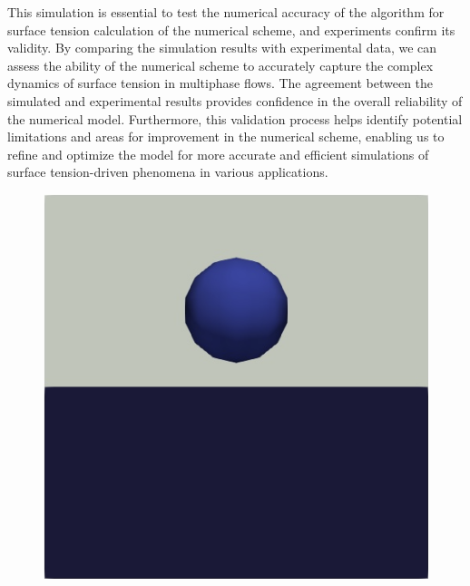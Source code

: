 This simulation is essential to test the numerical accuracy of the algorithm for surface tension calculation of the numerical scheme, and experiments confirm its validity. By comparing the simulation results with experimental data, we can assess the ability of the numerical scheme to accurately capture the complex dynamics of surface tension in multiphase flows. The agreement between the simulated and experimental results provides confidence in the overall reliability of the numerical model. Furthermore, this validation process helps identify potential limitations and areas for improvement in the numerical scheme, enabling us to refine and optimize the model for more accurate and efficient simulations of surface tension-driven phenomena in various applications.
\begin{figure}[H]
    \centering
    \begin{minipage}{.4\textwidth}
        \centering
        \includegraphics[width=\linewidth]{GWU_Thesis_Sarmakeeva/Images/chap4/water_sphere/sphere_in_water0.png}
    \end{minipage}%
    \hspace{0.05\textwidth}
    \begin{minipage}{.4\textwidth}
        \centering

\end{minipage}
\end{figure}
